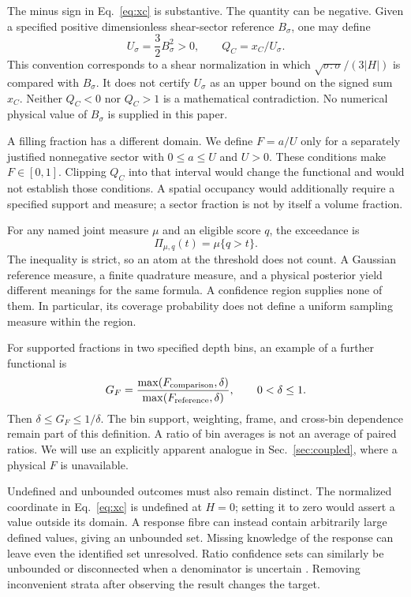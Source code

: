 The minus sign in Eq.~\eqref{eq:xc} is substantive. The quantity can be negative. Given a specified positive dimensionless shear-sector reference $B_\sigma$, one may define
\begin{equation}
 U_\sigma=\frac32 B_\sigma^2>0,\qquad Q_C=x_C/U_\sigma.
 \label{eq:q}
\end{equation}
This convention corresponds to a shear normalization in which $\sqrt{\sigma:\sigma}/(3|H|)$ is compared with $B_\sigma$. It does not certify $U_\sigma$ as an upper bound on the signed sum $x_C$. Neither $Q_C<0$ nor $Q_C>1$ is a mathematical contradiction. No numerical physical value of $B_\sigma$ is supplied in this paper.

A filling fraction has a different domain. We define $F=a/U$ only for a separately justified nonnegative sector with $0\leq a\leq U$ and $U>0$. These conditions make $F\in[0,1]$. Clipping $Q_C$ into that interval would change the functional and would not establish those conditions. A spatial occupancy would additionally require a specified support and measure; a sector fraction is not by itself a volume fraction.

For any named joint measure $\mu$ and an eligible score $q$, the exceedance is
\begin{equation}
 \Pi_{\mu,q}(t)=\mu\{q>t\}.
 \label{eq:pi}
\end{equation}
The inequality is strict, so an atom at the threshold does not count. A Gaussian reference measure, a finite quadrature measure, and a physical posterior yield different meanings for the same formula. A confidence region supplies none of them. In particular, its coverage probability does not define a uniform sampling measure within the region.

For supported fractions in two specified depth bins, an example of a further functional is
\begin{equation}
 G_F=\frac{\max(F_{\rm comparison},\delta)}{\max(F_{\rm reference},\delta)},
 \qquad 0<\delta\leq1.
 \label{eq:gf}
\end{equation}
Then $\delta\leq G_F\leq1/\delta$. The bin support, weighting, frame, and cross-bin dependence remain part of this definition. A ratio of bin averages is not an average of paired ratios. We will use an explicitly apparent analogue in Sec.~\ref{sec:coupled}, where a physical $F$ is unavailable.

Undefined and unbounded outcomes must also remain distinct. The normalized coordinate in Eq.~\eqref{eq:xc} is undefined at $H=0$; setting it to zero would assert a value outside its domain. A response fibre can instead contain arbitrarily large defined values, giving an unbounded set. Missing knowledge of the response can leave even the identified set unresolved. Ratio confidence sets can similarly be unbounded or disconnected when a denominator is uncertain \cite{LuxburgFranz2009}. Removing inconvenient strata after observing the result changes the target.
